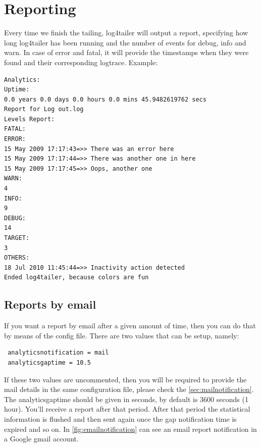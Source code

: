 \section{Reporting}
Every time we finish the tailing, log4tailer will output a report, specifying
how long log4tailer has been running and the number of events for debug, info
and warn. In case of error and fatal, it will provide the timestamps when they
were found and their corresponding logtrace.  Example:

\begin{verbatim}
Analytics: 
Uptime: 
0.0 years 0.0 days 0.0 hours 0.0 mins 45.9482619762 secs 
Report for Log out.log
Levels Report: 
FATAL:
ERROR:
15 May 2009 17:17:43=>> There was an error here
15 May 2009 17:17:44=>> There was another one in here
15 May 2009 17:17:45=>> Oops, another one
WARN:
4
INFO:
9
DEBUG:
14
TARGET:
3
OTHERS:
18 Jul 2010 11:45:44=>> Inactivity action detected
Ended log4tailer, because colors are fun
\end{verbatim}

\subsection{Reports by email}
If you want a report by email after a given amount of time, then you can do
that by means of the config file. There are two values that can be setup,
namely:

\begin{config}
\begin{verbatim}
 analyticsnotification = mail
 analyticsgaptime = 10.5
\end{verbatim}
\end{config}

If these two values are uncommented, then you will be required to provide the
mail details in the same configuration file, please check the
\autoref{sec:mailnotification}. The analyticsgaptime should be given in
seconds, by default is 3600 seconds (1 hour).  You'll receive a report after
that period. After that period the statistical information is flushed and then
sent again once the gap notification time is expired and so on.  In
\autoref{fig:emailnotification} %
can see an email report notification in a Google gmail account.

